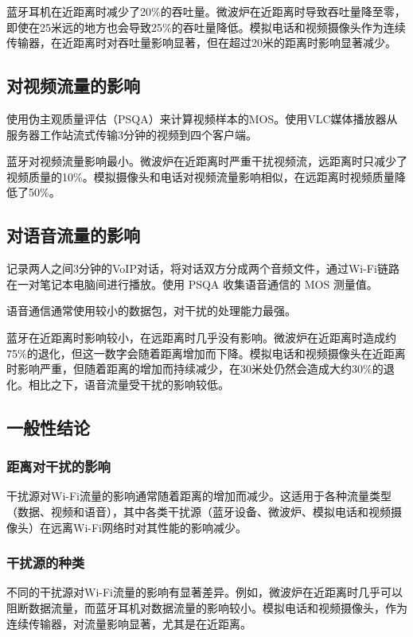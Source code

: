 蓝牙耳机在近距离时减少了20\%的吞吐量。微波炉在近距离时导致吞吐量降至零，即使在25米远的地方也会导致25\%的吞吐量降低。模拟电话和视频摄像头作为连续传输器，在近距离时对吞吐量影响显著，但在超过20米的距离时影响显著减少。

\subsection{对视频流量的影响}

使用伪主观质量评估（PSQA）来计算视频样本的MOS。使用VLC媒体播放器从服务器工作站流式传输3分钟的视频到四个客户端。

蓝牙对视频流量影响最小。微波炉在近距离时严重干扰视频流，远距离时只减少了视频质量的10\%。模拟摄像头和电话对视频流量影响相似，在远距离时视频质量降低了50\%。

\subsection{对语音流量的影响}

记录两人之间3分钟的VoIP对话，将对话双方分成两个音频文件，通过Wi-Fi链路在一对笔记本电脑间进行播放。使用 PSQA 收集语音通信的 MOS 测量值。

语音通信通常使用较小的数据包，对干扰的处理能力最强。

蓝牙在近距离时影响较小，在远距离时几乎没有影响。微波炉在近距离时造成约75\%的退化，但这一数字会随着距离增加而下降。模拟电话和视频摄像头在近距离时影响严重，但随着距离的增加而持续减少，在30米处仍然会造成大约30\%的退化。相比之下，语音流量受干扰的影响较低。

\subsection{一般性结论}

\subsubsection{距离对干扰的影响}

干扰源对Wi-Fi流量的影响通常随着距离的增加而减少。这适用于各种流量类型（数据、视频和语音），其中各类干扰源（蓝牙设备、微波炉、模拟电话和视频摄像头）在远离Wi-Fi网络时对其性能的影响减少。

\subsubsection{干扰源的种类}

不同的干扰源对Wi-Fi流量的影响有显著差异。例如，微波炉在近距离时几乎可以阻断数据流量，而蓝牙耳机对数据流量的影响较小。模拟电话和视频摄像头，作为连续传输器，对流量影响显著，尤其是在近距离。

